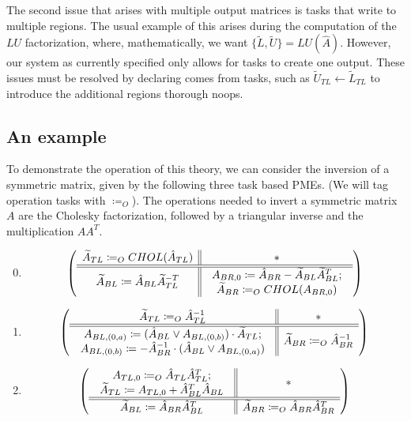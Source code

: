 \documentclass[12pt,letterpaper]{article}
\begin{document}
The second issue that arises with multiple output matrices is tasks that write to multiple regions.
The usual example of this arises during the computation of the $LU$ factorization, where, mathematically, we want $\{\widetilde{L}, \widetilde{U}\} = LU(\hat{A})$.
However, our system as currently specified only allows for tasks to create one output.
These issues must be resolved by declaring comes from tasks, such as $\widetilde{U}_{TL} \leftarrow \widetilde{L}_{TL}$ to introduce the additional regions thorough noops.
\subsection{An example}
To demonstrate the operation of this theory, we can consider the inversion of a symmetric matrix, given by the following three task based PMEs. (We will tag operation tasks with $\coloneqq_O$).
The operations needed to invert a symmetric matrix $A$ are the Cholesky factorization, followed by a triangular inverse and the multiplication $AA^{T}$.

\begin{enumerate}
\setcounter{enumi}{-1} %
\item
  \begin{equation*}
  \left( \begin{array}{c || c} \widetilde{A}_{TL} \coloneqq_O CHOL(\hat{A}_{TL}) & * \\ \hline \hline \widetilde{A}_{BL} \coloneqq \hat{A}_{BL}\widetilde{A}_{TL}^{-T} & \begin{array}{c}
     A_{BR, 0} \coloneqq \hat{A}_{BR} - \widetilde{A}_{BL}\widetilde{A}_{BL}^T;\\
     \widetilde{A}_{BR} \coloneqq_O CHOL(A_{BR, 0})
   \end{array} \end{array} \right)
  \end{equation*}
\item
  \begin{equation*}
    \left( \begin{array}{c || c} \widetilde{A}_{TL} \coloneqq_O \hat{A}_{TL}^{-1} & * \\ \hline \hline \begin{array}{c}
       A_{BL, (0, a)} \coloneqq (\hat{A}_{BL} \vee A_{BL, (0, b)}) \cdot \widetilde{A}_{TL};\\
       A_{BL, (0, b)} \coloneqq -\hat{A}_{BR}^{-1} \cdot (\hat{A}_{BL} \vee A_{BL, (0, a)})
     \end{array} & \widetilde{A}_{BR} \coloneqq_O \hat{A}_{BR}^{-1} \end{array} \right)
  \end{equation*}
\item
  \begin{equation*}
    \left( \begin{array}{c || c} \begin{array}{c}
                   A_{TL, 0} \coloneqq_O \hat{A}_{TL}\hat{A}_{TL}^T;\\
                   \widetilde{A}_{TL} \coloneqq A_{TL, 0} + \hat{A}_{BL}^T\hat{A}_{BL}
                 \end{array} & * \\ \hline \hline \widetilde{A}_{BL} \coloneqq \hat{A}_{BR}\hat{A}_{BL}^T & \widetilde{A}_{BR} \coloneqq_O \hat{A}_{BR}\hat{A}_{BR}^T \end{array} \right)
  \end{equation*}
\end{enumerate}
\end{document}
